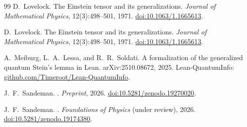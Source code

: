 \documentclass[11pt,a4paper]{article}
\theoremstyle{plain}
\theoremstyle{definition}
\theoremstyle{remark}
\begin{document}
\begin{thebibliography}{99}
D.~Lovelock.
\newblock The Einstein tensor and its generalizations.
\newblock \emph{Journal of Mathematical Physics}, 12(3):498--501, 1971.
\newblock \href{https://doi.org/10.1063/1.1665613}{doi:10.1063/1.1665613}.

D.~Lovelock.
\newblock The Einstein tensor and its generalizations.
\newblock \emph{Journal of Mathematical Physics}, 12(3):498--501, 1971.
\newblock \href{https://doi.org/10.1063/1.1665613}{doi:10.1063/1.1665613}.

A.~Meiburg, L.~A.~Lessa, and R.~R.~Soldati.
\newblock A formalization of the generalized quantum {Stein's} lemma in {Lean}.
\newblock arXiv:2510.08672, 2025.
\newblock Lean-QuantumInfo:
  \href{https://github.com/Timeroot/Lean-QuantumInfo}{github.com/Timeroot/Lean-QuantumInfo}.

J.~F.~Sandeman.
.
\newblock \textit{Preprint}, 2026.
\newblock \href{https://doi.org/10.5281/zenodo.19270020}{doi:10.5281/zenodo.19270020}.

J.~F.~Sandeman.
.
\newblock \textit{Foundations of Physics} (under review), 2026.
\newblock \href{https://doi.org/10.5281/zenodo.19174380}{doi:10.5281/zenodo.19174380}.

\end{thebibliography}
\end{document}
